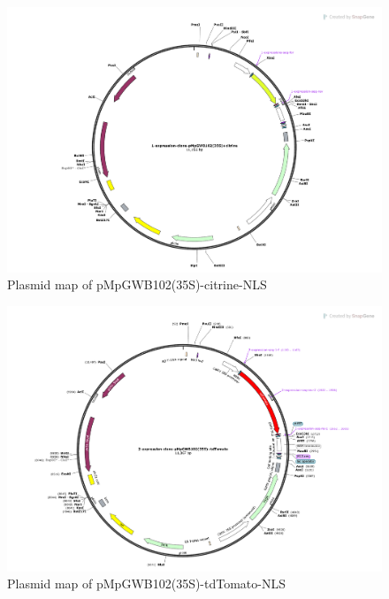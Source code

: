 \begin{figure}[htbp]
\centering
\includegraphics[width=1\textwidth]{Appendix2/Figs/1-expression-clone-pMpGWB102(35S)+citrine Map.pdf}
\caption{Plasmid map of pMpGWB102(35S)-citrine-NLS}
\label{fig:35S_citrine_map}
\end{figure}

\begin{figure}[htbp]
\centering
\includegraphics[width=1\textwidth]{Appendix2/Figs/2-expression-clone-pMpGWB102(35S)+tdTomato Map.pdf}
\caption{Plasmid map of pMpGWB102(35S)-tdTomato-NLS}
\label{fig:35S_tdTomato_map}
\end{figure}

